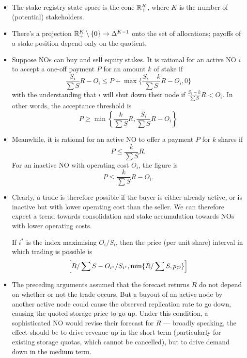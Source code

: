\begin{itemize}

  \item The stake registry state space is the cone $\mathbb{R}_+^K$, where $K$ is the number of (potential) stakeholders.

  \item There's a projection $\mathbb{R}_+^K\setminus\{0\}\rightarrow \Delta^{K-1}$ onto the set of allocations; payoffs of a stake position depend only on the quotient.

  \item Suppose NOs can buy and sell equity stakes. It is rational for an active NO $i$ to accept a one-off payment $P$ for an amount $k$ of stake if 
  \[
    \frac{S_i}{\sum S} R - O_i \leq P + \max\{ \frac{S_i-k}{\sum S} R - O_i, 0\}
  \]
  with the understanding that $i$ will shut down their node if $\frac{S_i-k}{\sum S}R<O_i$.
  In other words, the acceptance threshold is
  \[
    P \geq \min\left\{ \frac{k}{\sum S} R, \frac{S_i}{\sum S} R - O_i \right\}
  \]

  \item Meanwhile, it is rational for an active NO to offer a payment $P$ for $k$ shares if
  \[
    P \leq \frac{k}{\sum S}R.
  \]
  For an inactive NO with operating cost $O_i$, the figure is
  \[
    P \leq \frac{k}{\sum S}R - O_i.
  \]

  \item Clearly, a trade is therefore possible if the buyer is either already active, or is inactive but with lower operating cost than the seller.
  We can therefore expect a trend towards consolidation and stake accumulation towards NOs with lower operating costs.
  
  If $i^*$ is the index maximising $O_i/S_i$, then the price (per unit share) interval in which trading is possible is
  \[
    \left[ R/\sum S - O_{i^*}/S_{i^*}, \min\{ R/\sum S, p_{\mathcal{O}} \} \right]
  \]

  \item The preceding arguments assumed that the forecast returns $R$ do not depend on whether or not the trade occurs. 
  But a buyout of an active node by another active node could cause the observed replication rate to go down, causing the quoted storage price to go up. 
  Under this condition, a sophisticated NO would revise their forecast for $R$ --- broadly speaking, the effect should be to drive revenue up in the short term (particularly for existing storage quotas, which cannot be cancelled), but to drive demand down in the medium term.
  

\end{itemize}
